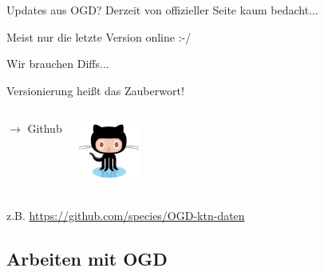 \documentclass{beamer}
\begin{document}
\begin{frame}{Updates aus OGD?}
	Derzeit von offizieller Seite kaum bedacht...
	\pause

	\vspace{3mm}
	Meist nur die letzte Version online :-/

	\pause
	\vspace{3mm}
	Wir brauchen Diffs...

	\pause
	\vspace{3mm}
	Versionierung heißt das Zauberwort!

	\begin{columns}[c] 
		\begin{center}
			{\LARGE $\rightarrow$ Github}
		\end{center}
		\begin{center}
			\includegraphics[width=2cm]{github.jpg}
		\end{center}
	\end{columns}

	\vspace{3mm}
	z.B. \url{https://github.com/species/OGD-ktn-daten}

\end{frame}

\subsection{Arbeiten mit OGD}
\end{document}
